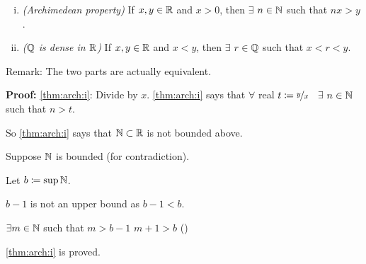 \documentclass[10pt,aspectratio=149]{beamer}
\begin{document}
\begin{frame}
\begin{theorem}
\leavevmode
\begin{enumerate}[(i)]
\item \label{thm:arch:i} \emph{(Archimedean property)}
If $x, y \in {\mathbb{R}}$ and
$x > 0$, then $\exists$ $n \in {\mathbb{N}}$ such that
$nx > y$.
\pause
\item \label{thm:arch:ii} \emph{(${\mathbb{Q}}$ is dense in ${\mathbb{R}}$)}
If $x, y \in {\mathbb{R}}$ and $x < y$, then $\exists$ $r \in {\mathbb{Q}}$ such that
$x < r < y$.
\end{enumerate}
\end{theorem}

\pause

Remark: The two parts are actually equivalent.

\medskip
\pause

\textbf{Proof:} \eqref{thm:arch:i}:
\pause
\quad
Divide by $x$.
\pause
\quad
\eqref{thm:arch:i} says that $\forall$ real $t\coloneqq \nicefrac{y}{x}$
~$\exists$ $n \in {\mathbb{N}}$ such that $n > t$.

\medskip
\pause

So \eqref{thm:arch:i} says that ${\mathbb{N}} \subset {\mathbb{R}}$ is not bounded above.

\medskip
\pause

Suppose ${\mathbb{N}}$ is bounded (for contradiction).

\medskip
\pause

Let $b \coloneqq \sup {\mathbb{N}}$.

\medskip
\pause

$b-1$ is not an upper bound as $b-1 < b$.

\medskip
\pause

\thus \quad
$\exists m \in {\mathbb{N}}$ such that $m > b-1$
\pause
\wthus $m+1 > b$ (\contradiction)

\medskip
\pause
\eqref{thm:arch:i} is proved. 
\end{frame}
\end{document}

